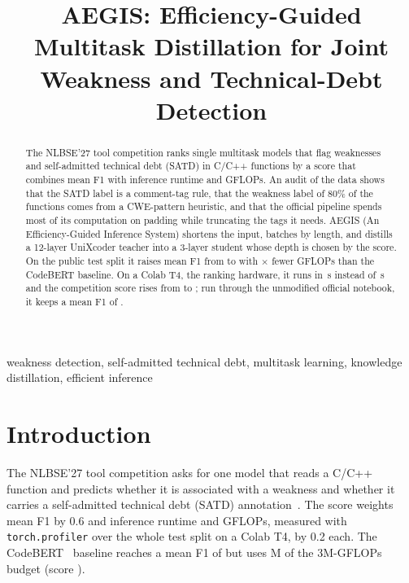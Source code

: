 \documentclass[10pt,conference]{IEEEtran}
\begin{document}
\title{AEGIS: Efficiency-Guided Multitask Distillation for Joint Weakness and Technical-Debt Detection}

\author{
\and
{}
}

\maketitle

\begin{abstract}
The NLBSE'27 tool competition ranks single multitask models that flag weaknesses and self-admitted technical
debt (SATD) in C/C++ functions by a score that combines mean F1 with inference runtime and GFLOPs. An audit of
the data shows that the SATD label is a comment-tag rule, that the weakness label of 80\% of the functions comes
from a CWE-pattern heuristic, and that the official pipeline spends most of its computation on padding while
truncating the tags it needs. AEGIS (An Efficiency-Guided Inference System) shortens the input, batches by
length, and distills a 12-layer UniXcoder teacher into a 3-layer student whose depth is chosen by the score.
On the public test split it raises mean F1 from \BaseMeanFone{} to \FinalMeanFone{} with
\FinalGflopsRatio$\times$ fewer GFLOPs than the CodeBERT baseline. On a Colab T4, the ranking hardware, it runs in
\TfourAegisRuntime\,s instead of \TfourBaseRuntime\,s and the competition score rises from \TfourBaseScore{} to
\TfourAegisScore; run through the unmodified official notebook, it keeps a mean F1 of \VanillaMeanFone.
\end{abstract}

\begin{IEEEkeywords}
weakness detection, self-admitted technical debt, multitask learning, knowledge distillation, efficient inference
\end{IEEEkeywords}

\section{Introduction}
The NLBSE'27 tool competition asks for one model that reads a C/C++ function and predicts whether it is
associated with a weakness and whether it carries a self-admitted technical debt (SATD) annotation~\cite{nlbse2027}.
The score weights mean F1 by 0.6 and inference runtime and GFLOPs, measured with \texttt{torch.profiler} over
the whole test split on a Colab T4, by 0.2 each. The CodeBERT~\cite{feng2020codebert} baseline reaches a mean F1
of \BaseMeanFone{} but uses \BaseGflopsM{}M of the 3M-GFLOPs budget (score \BaseScoreOfficial{}).
\end{document}
